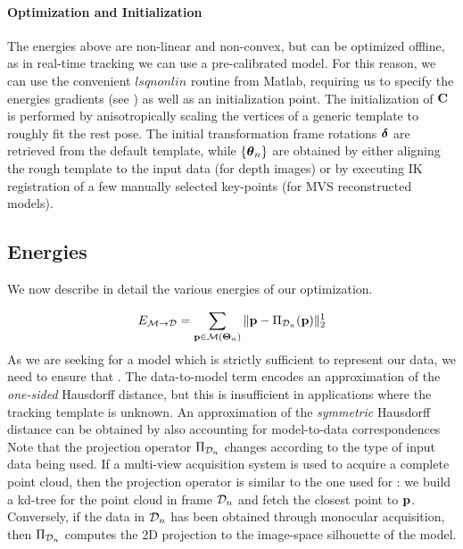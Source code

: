\paragraph{Optimization and Initialization}
The energies above are non-linear and non-convex, but can be optimized offline, as in real-time tracking we can use a pre-calibrated model. For this reason, we can use the convenient $lsqnonlin$ routine from Matlab, requiring us to specify the energies gradients (see ) as well as an initialization point. The initialization of ${\mathbf{C}}$ is performed  by anisotropically scaling the vertices of a generic template to roughly fit the rest pose. The initial transformation frame rotations $\boldsymbol{\delta}$ are retrieved from the default template, while ${\{\boldsymbol{\theta}_n\}}$ are obtained by either aligning the rough template to the input data (for depth images) or by executing IK registration of a few manually selected key-points (for MVS reconstructed models).



\subsection{Energies}
We now describe in detail the various energies of our optimization.

\begin{DRAFT}
\begin{equation}
E_{\mathcal{M} \rightarrow \mathcal{D}} = \sum_{\mathbf{p} \in \mathcal{M}(\boldsymbol{\Theta}_n)} \| \mathbf{p} - \Pi_{\mathcal{D}_n}(\mathbf{p})\|_2^1
\label{eq:m2d}
\end{equation}
As we are seeking for a model which is strictly sufficient to represent our data, we need to ensure that  . 
The data-to-model term encodes an approximation of the \emph{one-sided} Hausdorff distance, but this is insufficient in applications where the tracking template is unknown. An approximation of the \emph{symmetric} Hausdorff distance can be obtained by also accounting for model-to-data correspondences
% 
Note that the projection operator $\Pi_{\mathcal{D}_n}$ changes according to the type of input data being used. If a multi-view acquisition system is used to acquire a complete point cloud, then the projection operator is similar to the one used for : we build a kd-tree for the point cloud in frame $\mathcal{D}_n$ and fetch the closest point to $\mathbf{p}$. Conversely, if the data in $\mathcal{D}_n$ has been obtained through monocular acquisition, then $\Pi_{\mathcal{D}_n}$ computes the 2D projection to the image-space silhouette of the model.
\end{DRAFT}

